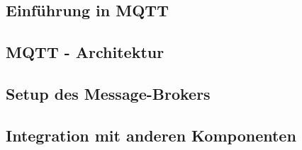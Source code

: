 \clearpage

\subsection{Einführung in MQTT}

\subsection{MQTT - Architektur}

\subsection{Setup des Message-Brokers}

\subsection{Integration mit anderen Komponenten}
